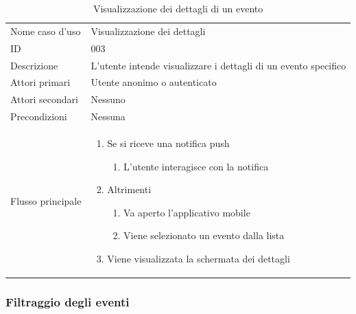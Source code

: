 \documentclass{article}
\begin{document}
\begin{table}[htbp]
    \centering
    \begin{tabularx}{\textwidth}{| l | p{} |}
        \Xhline{2pt} %
        Nome caso d'uso & Visualizzazione dei dettagli \\
        \Xhline{2pt} %
        ID & 003 \\
        \hline
        Descrizione & L'utente intende visualizzare i dettagli di un evento specifico\\
        \hline
        Attori primari & Utente anonimo o autenticato\\
        \hline
        Attori secondari & Nessuno \\
        \hline
        Precondizioni & Nessuna \\
        \hline
        Flusso principale & 
        \begin{enumerate}[topsep=5pt,partopsep=0pt,parsep=0pt,itemsep=0pt,before=\vspace{-\baselineskip},after=\vspace{-\baselineskip}]                
            \item Se si riceve una notifica push
            \begin{enumerate}[leftmargin=*, nosep]
                \item L'utente interagisce con la notifica
            \end{enumerate}
            \item Altrimenti
            \begin{enumerate}[leftmargin=*, nosep]
                \item Va aperto l'applicativo mobile
                \item Viene selezionato un evento dalla lista
            \end{enumerate}
            \item Viene visualizzata la schermata dei dettagli
        \end{enumerate}
        \\
        \hline
    \end{tabularx}
    \caption{Visualizzazione dei dettagli di un evento}
    \label{tab:tabella_use_case003}
\end{table}

\clearpage

\subsubsection{Filtraggio degli eventi}
\end{document}
